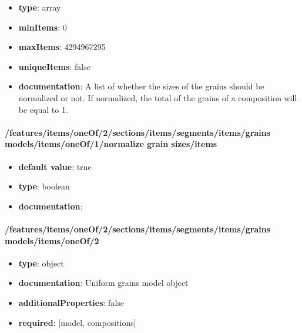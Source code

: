 \begin{itemize}\item {\bf type}: array
\item {\bf minItems}: 0
\item {\bf maxItems}: 4294967295
\item {\bf uniqueItems}: false
\item {\bf documentation}: A list of whether the sizes of the grains should be normalized or not. If normalized, the total of the grains of a composition will be equal to 1.
\end{itemize}\paragraph{/features/items/oneOf/2/sections/items/segments/items/grains models/items/oneOf/1/normalize grain sizes/items}
\begin{itemize}\item {\bf default value}: true
\item {\bf type}: boolean
\item {\bf documentation}: 
\end{itemize}\paragraph{/features/items/oneOf/2/sections/items/segments/items/grains models/items/oneOf/2}
\begin{itemize}\item {\bf type}: object
\item {\bf documentation}: Uniform grains model object
\item {\bf additionalProperties}: false
\item {\bf required}: [model, compositions]\end{itemize}
